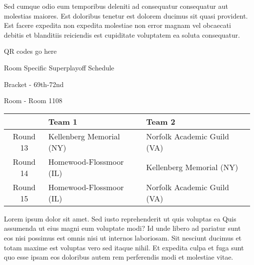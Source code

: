 \documentclass{article}%
\begin{document}
\newline%
Sed cumque odio eum temporibus deleniti ad consequatur consequatur aut molestias maiores. Est doloribus tenetur est dolorem ducimus sit quasi provident. Est facere expedita non expedita molestiae non error magnam vel obcaecati debitis et blanditiis reiciendis est cupiditate voluptatem ea soluta consequatur.%
\vspace*{140pt}%
\begin{center}%
\begin{Huge}%
QR codes go here%
\end{Huge}%
\end{center}%
\newpage%
\begin{center}%
\begin{Huge}%
Room Specific Superplayoff Schedule%
\end{Huge}%
\vspace*{8pt}%
\linebreak%
\begin{Large}%
Bracket {-} 69th{-}72nd%
\end{Large}%
\vspace*{8pt}%
\linebreak%
\vspace*{8pt}%
\begin{Large}%
Room {-} Room 1108%
\end{Large}%
\end{center}%
%
\begin{tabularx}{\textwidth}{|c|Y|Y|}%
\hline%
&Team 1&Team 2\\%
\hline%
Round 13&Kellenberg Memorial (NY)&Norfolk Academic Guild (VA)\\%
Round 14&Homewood{-}Flossmoor (IL)&Kellenberg Memorial (NY)\\%
Round 15&Homewood{-}Flossmoor (IL)&Norfolk Academic Guild (VA)\\%
\hline%
\end{tabularx}%
\vspace*{8pt}%
\newline%
Lorem ipsum dolor sit amet. Sed iusto reprehenderit ut quis voluptas ea Quis assumenda ut eius magni eum voluptate modi? Id unde libero ad pariatur sunt eos nisi possimus est omnis nisi ut internos laboriosam. Sit nesciunt ducimus et totam maxime est voluptas vero sed itaque nihil. Et expedita culpa et fuga sunt quo esse ipsam eos doloribus autem rem perferendis modi et molestiae vitae.\newline%
\newline%
\end{document}
